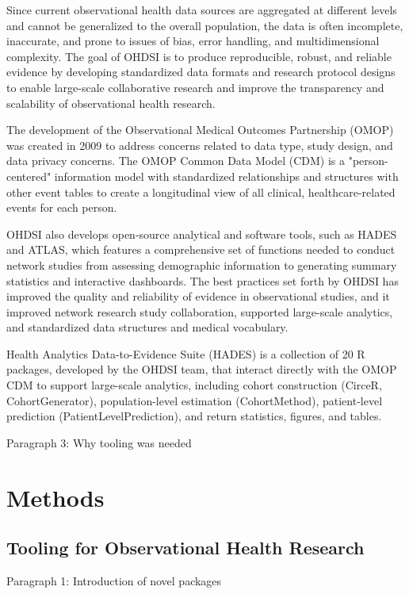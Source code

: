 \documentclass{juliacon}
\begin{document}
Since current observational health data sources are aggregated at different levels and cannot be generalized to the overall population, the data is often incomplete, inaccurate, and prone to issues of bias, error handling, and multidimensional complexity. The goal of OHDSI is to produce reproducible, robust, and reliable evidence by developing standardized data formats and research protocol designs to enable large-scale collaborative research and improve the transparency and scalability of observational health research. 

The development of the Observational Medical Outcomes Partnership (OMOP) was created in 2009 to address concerns related to data type, study design, and data privacy concerns. The OMOP Common Data Model (CDM) is a "person-centered" information model with standardized relationships and structures with other event tables to create a longitudinal view of all clinical, healthcare-related events for each person. 

OHDSI also develops open-source analytical and software tools, such as HADES and ATLAS, which features a comprehensive set of functions needed to conduct network studies from assessing demographic information to generating summary statistics and interactive dashboards. The best practices set forth by OHDSI has improved the quality and reliability of evidence in observational studies, and it improved network research study collaboration, supported large-scale analytics, and standardized data structures and medical vocabulary.  

Health Analytics Data-to-Evidence Suite (HADES) is a collection of 20 R packages, developed by the OHDSI team, that interact directly with the OMOP CDM to support large-scale analytics, including cohort construction (CirceR, CohortGenerator), population-level estimation (CohortMethod), patient-level prediction (PatientLevelPrediction), and return statistics, figures, and tables. 


Paragraph 3: Why tooling was needed

\section{Methods}

\subsection{Tooling for Observational Health Research}

Paragraph 1: Introduction of novel packages
\end{document}
